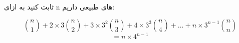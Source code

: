 \p    
ثابت کنید به ازای n های طبیعی داریم:

\[
\binom{n}{1} + 2\times3\binom{n}{2} + 3\times3^2\binom{n}{3} + 4\times3^3\binom{n}{4} +\ldots +
n\times3^{n-1}\binom{n}{n}
\]
\[
    = n\times4^{n-1}  
\]